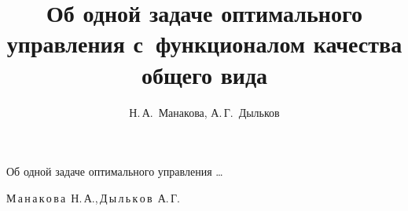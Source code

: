 
% 


% 

%



 \renewcommand{\firstpage}{18}

 \renewcommand{\lastpage}{24}




 \newcommand{\im}{\mathop{\rm im}\nolimits}%


















\title{Об одной задаче оптимального управления с~функционалом качества общего вида}%

{Об одной задаче оптимального управления \dots}%



\author{Н.\,А.~Манакова, А.\,Г.~Дыльков}%

{М\,а\,н\,а\,к\,о\,в\,а~Н.\,А.,\,Д\,ы\,л\,ь\,к\,о\,в~А.\,Г.}%






